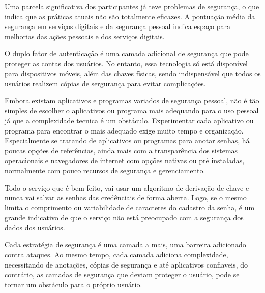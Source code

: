 \documentclass[12pt]{article}
\begin{document}
Uma parcela significativa dos participantes já teve problemas de segurança, o que
indica que as práticas atuais não são totalmente eficazes.
A pontuação média da segurança em serviços digitais e da segurança pessoal indica
espaço para melhorias das ações pessoais e dos serviços digitais.

O duplo fator de autenticação é uma camada adicional de segurança que pode proteger
as contas dos usuários.
No entanto, essa tecnologia só está disponível para dispositivos móveis, além das
chaves físicas, sendo indispensável que todos os usuários realizem cópias de sergurança
para evitar complicações.

Embora existam aplicativos e programas variados de segurança pessoal, não é tão simples
de escolher o aplicativos ou programa mais adequando para o uso pessoal já que a
complexidade tecnica é um obstáculo.
Experimentar cada aplicativo ou programa para encontrar o mais adequado exige muito tempo
e organização.
Especialmente se tratando de aplicativos ou programas para anotar senhas, há poucas
opções de referências, ainda mais com a transparência dos sistemas operacionais e
navegadores de internet com opções nativas ou pré instaladas, normalmente com pouco
recursos de segurança e gerenciamento.

Todo o serviço que é bem feito, vai usar um algoritmo de derivação de chave e
nunca vai salvar as senhas das credênciais de forma aberta.
Logo, se o mesmo limita o comprimento ou variabilidade de caracteres do cadastro da
senha, é um grande indicativo de que o serviço não está preocupado com a segurança
dos dados dos usuários.

Cada estratégia de segurança é uma camada a mais, uma barreira adicionado contra ataques.
Ao mesmo tempo, cada camada adiciona complexidade, necessitando de anotações, cópias de
segurança e até aplicativos confiaveis, do contrário, as camadas de segurança que deviam
proteger o usuário, pode se tornar um obstáculo para o próprio usuário.



\end{document}
